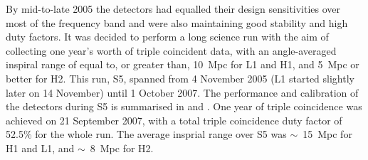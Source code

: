 By mid-to-late 2005 the detectors had equalled their design sensitivities over most of the frequency band and 
were also maintaining good stability and high duty factors. It was decided to perform a long science run with 
the aim of collecting one year's worth of triple coincident data, with an angle-averaged inspiral range of 
equal to, or greater than, 10~Mpc for L1 and H1, and 5~Mpc or better for H2. This run, S5, spanned from 4 
November 2005 (L1 started slightly later on 14 November) until 1 October 2007. The performance and 
calibration of the detectors during S5 is summarised in \cite{LIGOS5} and \cite{2010NIMPA.624..223A}. One year 
of triple coincidence was achieved on 21 September 2007, with a total triple coincidence duty factor of 52.5\% 
for the whole run. The average insprial range over S5 was $\sim$~15~Mpc for H1 and L1, and $\sim$~8~Mpc for 
H2.

